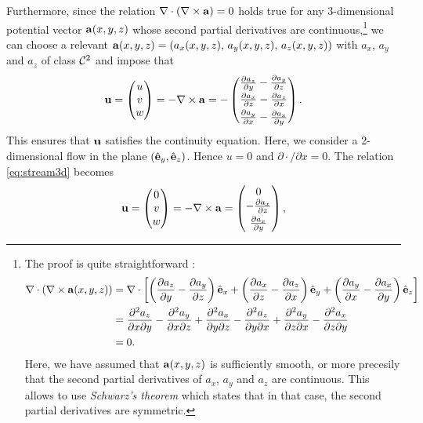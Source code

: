 Furthermore, since the relation $\nabla \cdot (\nabla \times \mathbf a) = 0$ holds true for any 3-dimensional potential vector $\mathbf a(x,y,z)$ whose second partial derivatives are continuous,\footnote{The proof is quite straightforward :
	\begin{align*}
		\nabla \cdot (\nabla \times \mathbf a(x,y,z)) &= \nabla \cdot \left[\left(\frac{\partial a_z}{\partial y}-\frac{\partial a_y}{\partial z}\right)\hat{\mathbf{e}}_x + \left(\frac{\partial a_x}{\partial z}-\frac{\partial a_z}{\partial x}\right)\hat{\mathbf{e}}_y + \left(\frac{\partial a_y}{\partial x}-\frac{\partial a_x}{\partial y}\right)\hat{\mathbf{e}}_z \right]\\
		&= \frac{\partial^2 a_z}{\partial x \partial y} - \frac{\partial^2 a_y}{\partial x \partial z} + \frac{\partial^2 a_x}{\partial y \partial z} - \frac{\partial^2 a_z}{\partial y \partial x} + \frac{\partial^2 a_y}{\partial z \partial x} - \frac{\partial^2 a_x}{\partial z \partial y}\\
		&= 0.  
	\end{align*}
	Here, we have assumed that $\mathbf a(x,y,z)$ is sufficiently smooth, or more precesily that the second partial derivatives of $a_x$, $a_y$ and $a_z$ are continuous. This allows to use \textit{Schwarz's theorem} which states that in that case, the second partial derivatives are symmetric.
} 
we can choose a relevant $\mathbf a(x,y,z) = (a_x(x,y,z),\,a_y(x,y,z),\,a_z(x,y,z))$ with $a_x$, $a_y$ and $a_z$ of class $\mathcal{C}^2$ and impose that 
\begin{equation} \label{eq:stream3d}
	\mathbf u = \begin{pmatrix} u \\ v \\ w \end{pmatrix} = - \nabla \times \mathbf a = - \begin{pmatrix} \frac{\partial a_z}{\partial y}-\frac{\partial a_y}{\partial z}\\[.1 cm]
													\frac{\partial a_x}{\partial z}-\frac{\partial a_z}{\partial x}\\[.1 cm]
													\frac{\partial a_y}{\partial x}-\frac{\partial a_x}{\partial y}
									\end{pmatrix}.
\end{equation}
This ensures that $\mathbf u$ satisfies the continuity equation. Here, we consider a 2-dimensional flow in the plane $(\hat{\mathbf{e}}_y,\hat{\mathbf{e}}_z)$. Hence $u = 0$ and $\partial \cdot/\partial x = 0$. The relation \eqref{eq:stream3d} becomes 
\begin{equation}
	\mathbf u = \begin{pmatrix} 0 \\ v \\ w \end{pmatrix} = - \nabla \times \mathbf a = \begin{pmatrix} 0\\ - \frac{\partial a_x}{\partial z}\\[.1 cm] \frac{\partial a_x}{\partial y} \end{pmatrix},
\end{equation}
